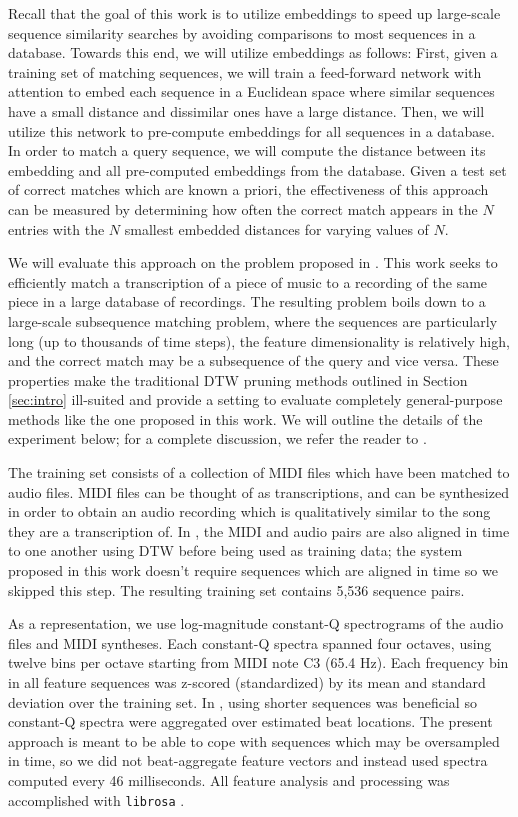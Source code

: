 \documentclass{article}
\begin{document}
Recall that the goal of this work is to utilize embeddings to speed up large-scale sequence similarity searches by avoiding comparisons to most sequences in a database.
Towards this end, we will utilize embeddings as follows:
First, given a training set of matching sequences, we will train a feed-forward network with attention to embed each sequence in a Euclidean space where similar sequences have a small distance and dissimilar ones have a large distance.
Then, we will utilize this network to pre-compute embeddings for all sequences in a database.
In order to match a query sequence, we will compute the distance between its embedding and all pre-computed embeddings from the database.
Given a test set of correct matches which are known a priori, the effectiveness of this approach can be measured by determining how often the correct match appears in the $N$ entries with the $N$ smallest embedded distances for varying values of $N$.

We will evaluate this approach on the problem proposed in \cite{raffel2015large}.
This work seeks to efficiently match a transcription of a piece of music to a recording of the same piece in a large database of recordings.
The resulting problem boils down to a large-scale subsequence matching problem, where the sequences are particularly long (up to thousands of time steps), the feature dimensionality is relatively high, and the correct match may be a subsequence of the query and vice versa.
These properties make the traditional DTW pruning methods outlined in Section \ref{sec:intro} ill-suited and provide a setting to evaluate completely general-purpose methods like the one proposed in this work.
We will outline the details of the experiment below; for a complete discussion, we refer the reader to \cite{raffel2015large}.

The training set consists of a collection of MIDI files which have been matched to audio files.
MIDI files can be thought of as transcriptions, and can be synthesized in order to obtain an audio recording which is qualitatively similar to the song they are a transcription of.
In \cite{raffel2015large}, the MIDI and audio pairs are also aligned in time to one another using DTW before being used as training data; the system proposed in this work doesn't require sequences which are aligned in time so we skipped this step.
The resulting training set contains 5,536 sequence pairs.

As a representation, we use log-magnitude constant-Q spectrograms \cite{brown1991calculation} of the audio files and MIDI syntheses.
Each constant-Q spectra spanned four octaves, using twelve bins per octave starting from MIDI note C3 (65.4 Hz).
Each frequency bin in all feature sequences was z-scored (standardized) by its mean and standard deviation over the training set.
In \cite{raffel2015large}, using shorter sequences was beneficial so constant-Q spectra were aggregated over estimated beat locations.
The present approach is meant to be able to cope with sequences which may be oversampled in time, so we did not beat-aggregate feature vectors and instead used spectra computed every 46 milliseconds.
All feature analysis and processing was accomplished with \texttt{librosa} \cite{mcfee2015librosa, mcfee2015librosa_scipy}.
\end{document}
